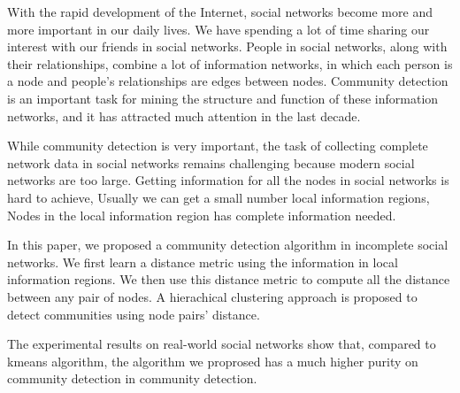 \begin{englishabstract}
    With the rapid development of the Internet, 
    social networks become more and more important in our daily lives.
    We have spending a lot of time sharing our interest with our friends
    in social networks. People in social networks, along with their relationships,
    combine a lot of information networks, in which each person is a node and people's 
    relationships are edges between nodes. Community detection is an important task
    for mining the structure and function of these information networks, and it has
    attracted much attention in the last decade.

    While community detection is very important, the task of collecting complete network
    data in social networks remains challenging because modern social networks are too large.
    Getting information for all the nodes in social networks is hard to achieve, 
    Usually we can get a small number local information regions, 
    Nodes in the local information region has complete information needed.

    In this paper, we proposed a community detection algorithm in incomplete social networks.
    We first learn a distance metric using the information in local information regions.
    We then use this distance metric to compute all the distance between any pair of nodes.
    A hierachical clustering approach is proposed to detect communities using node pairs'
    distance.

    The experimental results on real-world social networks show that, compared to kmeans algorithm, the algorithm 
    we proprosed has a much higher purity on community detection in community detection.

\end{englishabstract}
